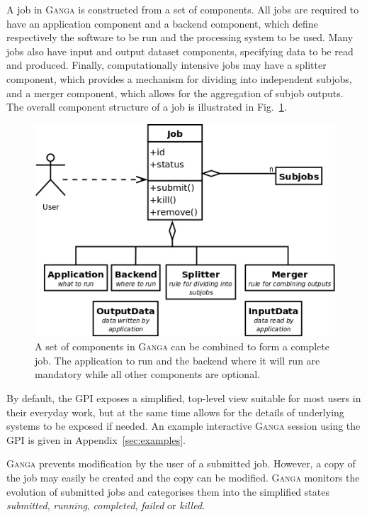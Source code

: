 \documentclass{elsart}
\def\ganga {\textsc{Ganga}\xspace}
\def\GPI{GPI\xspace}
\newcommand{\val}[1]{\emph{#1}}
\begin{document}
\begin{linenumbers}
A job in \ganga is constructed from a set of components. All jobs are
required to have an application component and a backend component, which
define respectively the software to be run and the processing system to be
used.  Many jobs also have input and output dataset components,
specifying data to be read and produced.  Finally, computationally intensive
jobs may have a splitter component, which provides a mechanism for dividing
into independent subjobs, and a merger component, which allows for the
aggregation of subjob outputs. The overall component structure of a job is
illustrated in Fig.~\ref{fig:JobComponents}.
\begin{figure}
  \centering
  \includegraphics[width=14cm]{job-uml}
  \caption{A set of components in \ganga can be combined to form a complete
    job. The application to run and the backend where it will run are
    mandatory while all other components are optional.}
  \label{fig:JobComponents}
\end{figure}

By default, the \GPI exposes a simplified, top-level view suitable for most
users in their everyday work, but at the same time allows for the details of
underlying systems to be exposed if needed. An example interactive \ganga
session using the GPI is given in Appendix~\ref{sec:examples}.

\ganga prevents modification by the user of a submitted job.  However,
a copy of the job may easily be created and the copy can be modified.
\ganga monitors the evolution of submitted jobs and categorises
them into the simplified states \val{submitted}, \val{running},
\val{completed}, \val{failed} or \val{killed}.


\end{linenumbers}
\end{document}
